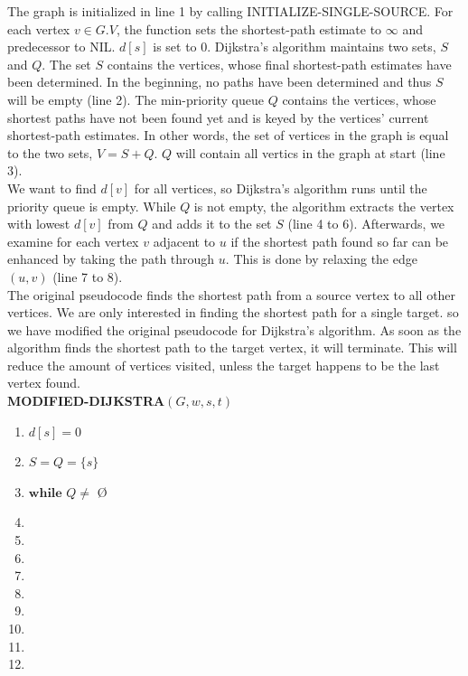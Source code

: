 \documentclass[11pt]{article}
\begin{document}
\noindent The graph is initialized in line 1 by calling INITIALIZE-SINGLE-SOURCE. For each vertex $v \in G.V$, the function sets the shortest-path estimate to $\infty$ and predecessor to NIL. $d[s]$ is set to 0. Dijkstra's algorithm maintains two sets, $S$ and $Q$. The set $S$ contains the vertices, whose final shortest-path estimates have been determined. In the beginning, no paths have been determined and thus $S$ will be empty (line 2). The min-priority queue $Q$ contains the vertices, whose shortest paths have not been found yet and is keyed by the vertices' current shortest-path estimates. In other words, the set of vertices in the graph is equal to the two sets, $V = S + Q$. $Q$ will contain all vertics in the graph at start (line 3).\\
We want to find $d[v]$ for all vertices, so Dijkstra's algorithm runs until the priority queue is empty. While $Q$ is not empty, the algorithm extracts the vertex with lowest $d[v]$ from $Q$ and adds it to the set $S$ (line 4 to 6). Afterwards, we examine for each vertex $v$ adjacent to $u$ if the shortest path found so far can be enhanced by taking the path through $u$. This is done by relaxing the edge $(u,v)$ (line 7 to 8).\\


\noindent The original pseudocode finds the shortest path from a source vertex to all other vertices. We are only interested in finding the shortest path for a single target. so we have modified the original pseudocode for Dijkstra's algorithm. As soon as the algorithm finds the shortest path to the target vertex, it will terminate. This will reduce the amount of vertices visited, unless the target happens to be the last vertex found.\\

\textbf{MODIFIED-DIJKSTRA$(G, w, s, t)$}
\begin{enumerate}
\setlength\itemsep{0em}
\item $d[s] = 0$
\item $S = Q = \{s\}$
\item $\textbf{while } Q \neq  $ \O
\item {}
\item {}
\item \tab{}
\item {}
\item \tab{}
\item \tab{}\tab{}
\item \tab{}\tab{}
\item \tab{}\tab{}
\item \tab{}\tab{}
\end{enumerate}
\end{document}
